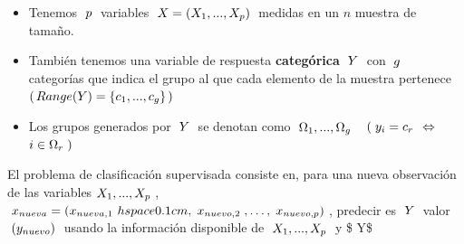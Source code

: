 \documentclass[
  11pt,
  a4paper,
]{article}
\begin{document}
\begin{itemize}
\item
  Tenemos \(\hspace{0.1cm} p \hspace{0.1cm}\) variables
  \(\hspace{0.1cm} X=(X_1,...,X_p) \hspace{0.1cm}\) medidas en un \(n\)
  muestra de tamaño.
\item
  También tenemos una variable de respuesta \textbf{categórica}
  \(\hspace{0.1cm} Y \hspace{0.1cm}\) con
  \(\hspace{0.1cm} g \hspace{0.1cm}\) categorías que indica el grupo al
  que cada elemento de la muestra pertenece
  \(( \hspace{0.05cm} Range(Y)=\lbrace c_1 ,..., c_g \rbrace \hspace{0.05cm})\)
\item
  Los grupos generados por \(\hspace{0.1cm} Y \hspace{0.1cm}\) se
  denotan como
  \(\hspace{0.1cm} \Omega_1 ,..., \Omega_g \hspace{0.15cm}\)
  \(\hspace{ 0.15cm}( \hspace{0.1cm} y_i = c_r \hspace{0.15cm} \Leftrightarrow \hspace{0.15cm}\)
  \(i \in \Omega_r \hspace{0.1cm})\)
\end{itemize}

\vspace{0.3cm}

El problema de clasificación supervisada consiste en, para una nueva
observación de las variables \(X_1,...,X_p \hspace{0.1cm}\),
\(\hspace{0.1cm} x_{nueva} = (x_{nueva,1}\ hspace{0.1cm},\hspace{0.1cm}x_{nuevo,2}\hspace{0.1cm},\dots,\hspace{0.1cm}x_{nuevo,p}) \hspace{0.1cm}\),
predecir es \(\hspace{0.1cm} Y \hspace{0.1cm}\) valor
\(\hspace{0.1cm} (y_{nuevo})\hspace{0.1cm}\) usando la información
disponible de \(\hspace{0.1cm} X_1 ,...,X_p \hspace{0.1cm}\) y \$
\hspace{0.1cm} Y\$
\end{document}
